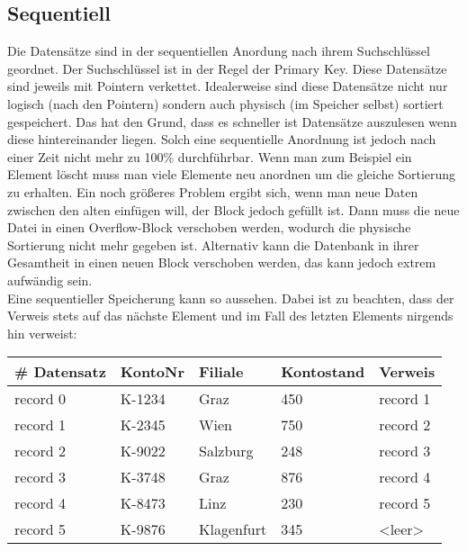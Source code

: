 \documentclass{article}
\begin{document}
	\subsection{Sequentiell}
	Die Datensätze sind in der sequentiellen Anordung nach ihrem Suchschlüssel geordnet. Der Suchschlüssel ist in der Regel der Primary Key. Diese Datensätze sind jeweils mit Pointern verkettet. Idealerweise sind diese Datensätze nicht nur logisch (nach den Pointern) sondern auch physisch (im Speicher selbst) sortiert gespeichert. Das hat den Grund, dass es schneller ist Datensätze auszulesen wenn diese hintereinander liegen. Solch eine sequentielle Anordnung ist jedoch nach einer Zeit nicht mehr zu 100\% durchführbar. Wenn man zum Beispiel ein Element löscht muss man viele Elemente neu anordnen um die gleiche Sortierung zu erhalten. Ein noch größeres Problem ergibt sich, wenn man neue Daten zwischen den alten einfügen will, der Block jedoch gefüllt ist. Dann muss die neue Datei in einen Overflow-Block verschoben werden, wodurch die physische Sortierung nicht mehr gegeben ist. Alternativ kann die Datenbank in ihrer Gesamtheit in einen neuen Block verschoben werden, das kann jedoch extrem aufwändig sein. \\
	Eine sequentieller Speicherung kann so aussehen. Dabei ist zu beachten, dass der Verweis stets auf das nächste Element und im Fall des letzten Elements nirgends hin verweist: \\
	\begin{tabular}{| l | l | l | l | l |}
		\toprule
		\# Datensatz & KontoNr & Filiale & Kontostand & Verweis \\ \midrule
		record 0 & K-1234 & Graz & 450 & record 1 \\ \hline
		record 1 & K-2345 & Wien & 750 & record 2 \\ \hline
		record 2 & K-9022 & Salzburg & 248 & record 3 \\ \hline
		record 3 & K-3748 & Graz & 876 & record 4 \\ \hline
		record 4 & K-8473 & Linz & 230 & record 5 \\ \hline
		record 5 & K-9876 & Klagenfurt & 345 & <leer> \\
		\bottomrule
	\end{tabular}
\end{document}

